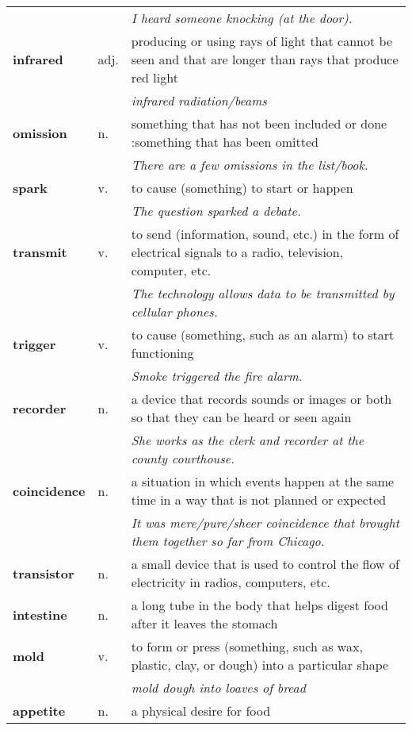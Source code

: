 \documentclass[a4paper]{article}
\begin{document}
\begin{longtable}{llp{11cm}}
 & & \textit{I heard someone knocking (at the door).}\\[0.08cm]
\textbf{infrared} & adj. &  producing or using rays of light that cannot be seen and that are longer than rays that produce red light \\
 & & \textit{infrared radiation/beams}\\[0.08cm]
\textbf{omission} & n. &  something that has not been included or done :something that has been omitted \\
 & & \textit{There are a few omissions in the list/book.}\\[0.08cm]
\textbf{spark} & v. &  to cause (something) to start or happen \\
 & & \textit{The question sparked a debate.}\\[0.08cm]
\textbf{transmit} & v. &  to send (information, sound, etc.) in the form of electrical signals to a radio, television, computer, etc. \\
 & & \textit{The technology allows data to be transmitted by cellular phones.}\\[0.08cm]
\textbf{trigger} & v. &  to cause (something, such as an alarm) to start functioning \\
 & & \textit{Smoke triggered the fire alarm.}\\[0.08cm]
\textbf{recorder} & n. &  a device that records sounds or images or both so that they can be heard or seen again \\
 & & \textit{She works as the clerk and recorder at the county courthouse.}\\[0.08cm]
\textbf{coincidence} & n. &  a situation in which events happen at the same time in a way that is not planned or expected \\
 & & \textit{It was mere/pure/sheer coincidence that brought them together so far from Chicago.}\\[0.08cm]
\textbf{transistor} & n. &  a small device that is used to control the flow of electricity in radios, computers, etc.\\[0.08cm]
\textbf{intestine} & n. &  a long tube in the body that helps digest food after it leaves the stomach \\[0.08cm]
\textbf{mold} & v. &  to form or press (something, such as wax, plastic, clay, or dough) into a particular shape \\
 & & \textit{mold dough into loaves of bread}\\[0.08cm]
\textbf{appetite} & n. &  a physical desire for food \\

\end{longtable}
\end{document}
